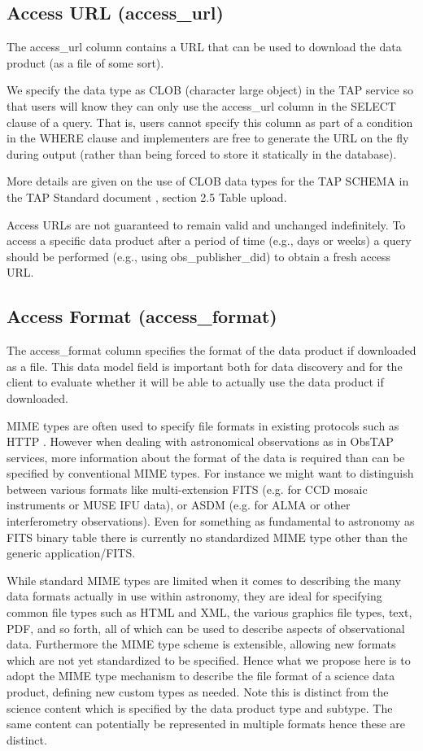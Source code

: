\documentclass[11pt,a4paper]{ivoa}
\begin{document}
\subsection{Access URL (access\_url)}
The access\_url column contains a URL that can be used to download the data product (as a file of some sort).

We specify the data type as CLOB (character large object) in the TAP service so that users will know they can only use
the access\_url column in the SELECT clause of a query.  That is, users cannot specify this column as part of a
condition in the WHERE clause and implementers are free to generate the URL on the fly during output (rather than being
forced to store it statically in the database).

More details are given on the use of CLOB data types for the TAP SCHEMA in the TAP Standard document
\citep{2010ivoa.spec.0327D}, section 2.5 Table upload.

Access URLs are not guaranteed to remain valid and unchanged indefinitely.  To access a specific data product after a
period of time (e.g., days or weeks) a query should be performed (e.g., using obs\_publisher\_did) to obtain a fresh
access URL.

\subsection{Access Format (access\_format)}
\label{bkm:Ref289893457}The access\_format column specifies the format of the data product if downloaded as a file. This
data model field is important both for data discovery and for the client to evaluate whether it will be able to
actually use the data product if downloaded.

MIME types are often used to specify file formats in existing protocols such as HTTP \citep{std:MIME_types}.  However
when dealing with astronomical observations as in ObsTAP services, more information about the format of the data is
required than can be specified by conventional MIME types.  For instance we might want to distinguish between various
formats like multi-extension FITS (e.g. for CCD mosaic instruments or MUSE IFU data), or ASDM (e.g. for ALMA or other
interferometry observations).  Even for something as fundamental to astronomy as FITS binary table there is currently
no standardized MIME type other than the generic application/FITS.

While standard MIME types are limited when it comes to describing the many data formats actually in use within
astronomy, they are ideal for specifying common file types such as HTML and XML, the various graphics file types, text,
PDF, and so forth, all of which can be used to describe aspects of observational data.  Furthermore the MIME type
scheme is extensible, allowing new formats which are not yet standardized to be specified.  Hence what we propose here
is to adopt the MIME type mechanism to describe the file format of a science data product, defining new custom types as
needed.  Note this is distinct from the science content which is specified by the data product type and subtype.  The
same content can potentially be represented in multiple formats hence these are distinct.
\end{document}
